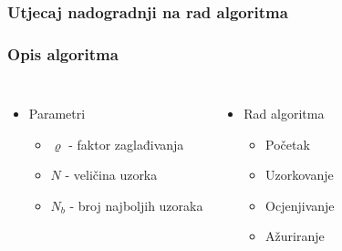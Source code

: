 \documentclass{beamer}
\begin{document}
  \begin{frame}
  \frametitle{Utjecaj nadogradnji na rad algoritma}
  \begin{table}
    \caption{Utjecaj nadogradnji algoritma}
    \label{tbl:razvoj}
    \centering
  \end{table}
  \end{frame}

\begin{frame}
  \frametitle{Opis algoritma}
    \begin{columns}[t]
      \begin{itemize}
      \item Parametri
        \begin{itemize}
          \item $\varrho$ - faktor zaglađivanja
          \item $N$ - veličina uzorka
          \item $N_b$ - broj najboljih uzoraka
        \end{itemize}
      \end{itemize}
        \begin{itemize}
        \item Rad algoritma
        \begin{itemize}
          \item Početak
          \item Uzorkovanje
          \item Ocjenjivanje
          \item Ažuriranje
        \end{itemize}
        \end{itemize}
    \end{columns}
\end{frame}
\end{document}
